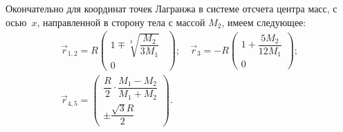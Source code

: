 Окончательно для координат точек Лагранжа в системе отсчета центра масс, с осью~$x$, направленной в сторону тела с массой $M_2$, имеем следующее:
\begin{equation}
    \begin{gathered}
        \vec{r}_{1,2} = R \begin{pmatrix}
            1 \mp \sqrt[3]{\dfrac{M_2}{3M_1}}~~\\[1pc]
            0
        \end{pmatrix}; \quad
        \vec{r}_3 = - R \begin{pmatrix}
            1 + \dfrac{5 M_2}{12 M_1}\\[1pc]
            0
        \end{pmatrix};\\[0.5pc]
        \vec{r}_{4,5} = \begin{pmatrix}
            \dfrac{R}{2} \cdot \dfrac{M_1-M_2}{M_1+M_2}\\[1pc]
            \pm \dfrac{\sqrt{3}R}{2}
        \end{pmatrix}.
    \end{gathered}
\end{equation}

{\footnotesize }

